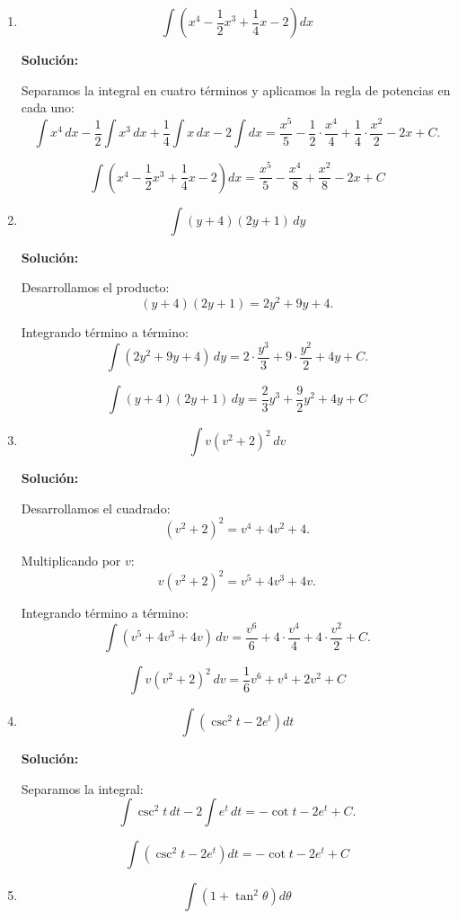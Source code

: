 \documentclass[12pt]{article}
\newcommand{\solucion}{%
    \vspace{0.8em}%
    \textbf{Solución:}%
}
\begin{document}
\begin{enumerate}[label=\alph*.-]

    \item
    \[
    \int\left(x^4-\frac12x^3+\frac14x-2\right)dx
    \]

    \solucion

    Separamos la integral en cuatro términos y aplicamos la regla de
    potencias en cada uno:
    \[
    \int x^4\,dx-\frac12\int x^3\,dx+\frac14\int x\,dx-2\int dx
    =\frac{x^5}{5}-\frac12\cdot\frac{x^4}{4}+\frac14\cdot\frac{x^2}{2}-2x+C.
    \]

    \[
    \boxed{
    \int\left(x^4-\frac12x^3+\frac14x-2\right)dx
    =\frac{x^5}{5}-\frac{x^4}{8}+\frac{x^2}{8}-2x+C
    }
    \]


    \item
    \[
    \int(y+4)(2y+1)\,dy
    \]

    \solucion

    Desarrollamos el producto:
    \[
    (y+4)(2y+1)=2y^2+9y+4.
    \]

    Integrando término a término:
    \[
    \int(2y^2+9y+4)\,dy
    =2\cdot\frac{y^3}{3}+9\cdot\frac{y^2}{2}+4y+C.
    \]

    \[
    \boxed{
    \int(y+4)(2y+1)\,dy=\frac23y^3+\frac92y^2+4y+C
    }
    \]


    \item
    \[
    \int v(v^2+2)^2\,dv
    \]

    \solucion

    Desarrollamos el cuadrado:
    \[
    (v^2+2)^2=v^4+4v^2+4.
    \]

    Multiplicando por $v$:
    \[
    v(v^2+2)^2=v^5+4v^3+4v.
    \]

    Integrando término a término:
    \[
    \int(v^5+4v^3+4v)\,dv
    =\frac{v^6}{6}+4\cdot\frac{v^4}{4}+4\cdot\frac{v^2}{2}+C.
    \]

    \[
    \boxed{
    \int v(v^2+2)^2\,dv=\frac16v^6+v^4+2v^2+C
    }
    \]


    \item
    \[
    \int\left(\csc^2 t-2e^t\right)dt
    \]

    \solucion

    Separamos la integral:
    \[
    \int\csc^2t\,dt-2\int e^t\,dt=-\cot t-2e^t+C.
    \]

    \[
    \boxed{
    \int\left(\csc^2 t-2e^t\right)dt=-\cot t-2e^t+C
    }
    \]


    \item
    \[
    \int\left(1+\tan^2\theta\right)d\theta
    \]


\end{enumerate}
\end{document}
